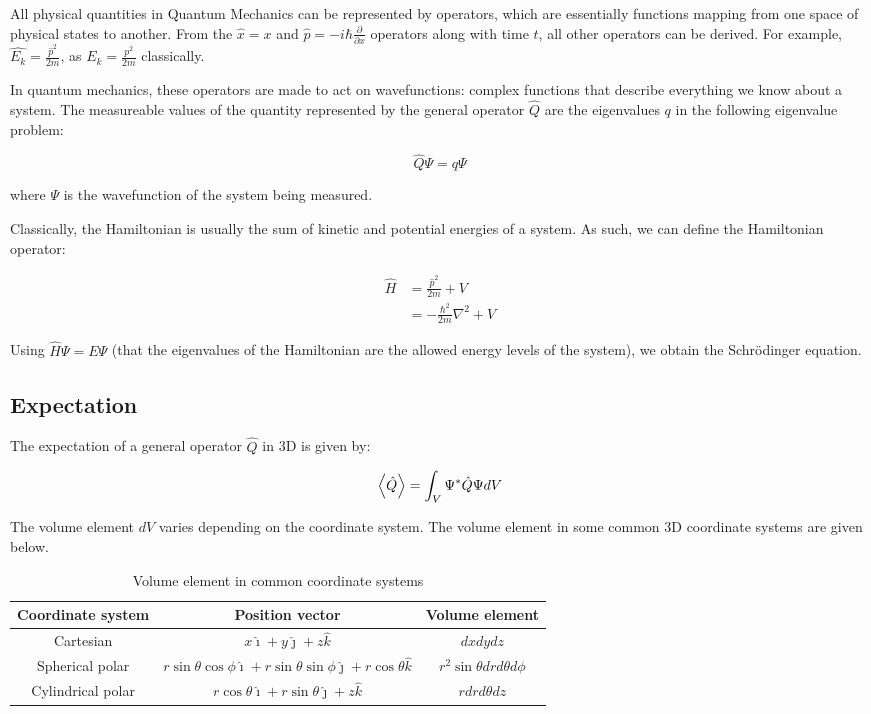 
All physical quantities in Quantum Mechanics can be represented by operators, which are essentially functions mapping from one space of physical states to another. From the $\hat{x} = x$ and $\hat{p} = -i\hbar\frac{\partial}{\partial x}$ operators along with time $t$, all other operators can be derived. For example, $\hat{E_k} = \frac{\hat{p}^2}{2m}$, as $E_k = \frac{p^2}{2m}$ classically. 

In quantum mechanics, these operators are made to act on wavefunctions: complex functions that describe everything we know about a system. The measureable values of the quantity represented by the general operator $\hat{Q}$ are the eigenvalues $q$ in the following eigenvalue problem:

\[ \hat{Q}\Psi = q\Psi \]

where $\Psi$ is the wavefunction of the system being measured. 

Classically, the Hamiltonian is usually the sum of kinetic and potential energies of a system. As such, we can define the Hamiltonian operator:

\begin{align*} 
\hat{H} &= \frac{\hat{p}^2}{2m} + V  \\
&= -\frac{\hbar^2}{2m} \nabla^2 + V
\end{align*}

Using $\hat{H}{\Psi} = E\Psi$ (that the eigenvalues of the Hamiltonian are the allowed energy levels of the system), we obtain the Schr\"odinger equation. 


\subsection{Expectation}

The expectation of a general operator $\hat{Q}$ in 3D is given by:

\[ \expval{\hat{Q}} = \int_{V} \Psi^*\hat{Q}\Psi dV \]

The volume element $dV$ varies depending on the coordinate system. The volume element in some common 3D coordinate systems are given below. 

\begin{table}[h!]
\centering
	\begin{tabular}{c|c|c}
	Coordinate system & Position vector & Volume element \\ \hline
	Cartesian & $x\hat{\imath} + y\hat{\jmath} + z\hat{k}$ & $dxdydz$ \\
	Spherical polar & $r\sin{\theta}\cos{\phi}\hat{\imath} + r\sin{\theta}\sin{\phi}\hat{\jmath} + r\cos{\theta}\hat{k}$ & $r^2\sin{\theta}drd\theta d\phi$ \\
	Cylindrical polar & $r\cos{\theta}\hat{\imath} + r\sin{\theta}\hat{\jmath} + z\hat{k}$ & $r dr d\theta dz$
	\end{tabular}
	\caption{Volume element in common coordinate systems}
\end{table}
